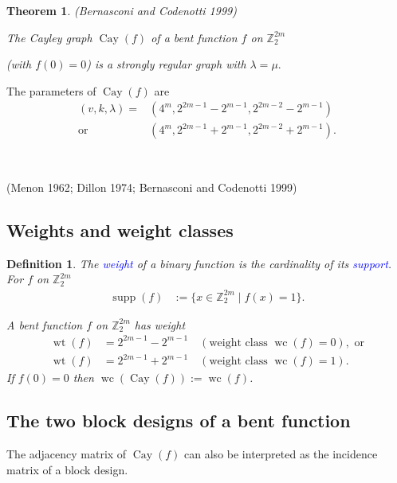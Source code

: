 \documentclass[12pt,a4paper]{article}
\newcommand{\mb}[1]{\mathbb{#1}}
\newcommand{\Z}{\mb{Z}}
\newcommand{\slidecite}[1]{\tiny{(#1)}\normalsize{}}
\newcommand{\smallcite}[1]{\small{(#1)}\normalsize{}}
\newcommand{\Emph}[1]{\emph{\textcolor{blue}{#1}}}
\newcommand{\Cay}[1]{\operatorname{Cay}\left(#1\right)}
\newcommand{\support}[1]{\operatorname{supp}\left(#1\right)}
\newcommand{\weight}[1]{\operatorname{wt}\left(#1\right)}
\newcommand{\weightclass}[1]{\operatorname{wc}\left(#1\right)}
\newtheorem{Theorem}{Theorem}
\newtheorem{Definition}{Definition}
\begin{document}
\begin{Theorem}
\smallcite{Bernasconi and Codenotti 1999}

The Cayley graph $\Cay{f}$ of a bent function $f$ on $\Z_2^{2m}$ 

(with $f(0)=0$) is a strongly regular graph with $\lambda = \mu.$ 
\end{Theorem}

The parameters of $\Cay{f}$ are
\begin{align*}
(v,k,\lambda) = &(4^m, 2^{2 m - 1} - 2^{m-1}, 2^{2 m - 2} - 2^{m-1}) 
\\
  \text{or} \quad &(4^m, 2^{2 m - 1} + 2^{m-1}, 2^{2 m - 2} + 2^{m-1}).
\end{align*}

~

\slidecite{Menon 1962; Dillon 1974; Bernasconi and Codenotti 1999}
\subsection*{Weights and weight classes}
\begin{Definition}
The \Emph{weight} of a binary function is the cardinality of its \Emph{support}.
For $f$ on $\Z_2^{2m}$
\begin{align*}
\support{f} &:= \{x \in \Z_2^{2m} \mid f(x)=1 \}.  
\end{align*}

A bent function $f$ on $\Z_2^{2m}$ has weight
\begin{align*}
\weight{f} &= 2^{2 m - 1} - 2^{m-1} \quad (\text{weight class~} \weightclass{f}=0), \text{~or}
\\
\weight{f} &= 2^{2 m - 1} + 2^{m-1} \quad (\text{weight class~} \weightclass{f}=1).
\end{align*}
If $f(0)=0$ then $\weightclass{\Cay{f}} := \weightclass{f}$.
\end{Definition}

\subsection*{The two block designs of a bent function}

The adjacency matrix of $\Cay{f}$ can also be interpreted as the incidence matrix of a block design.
\end{document}

